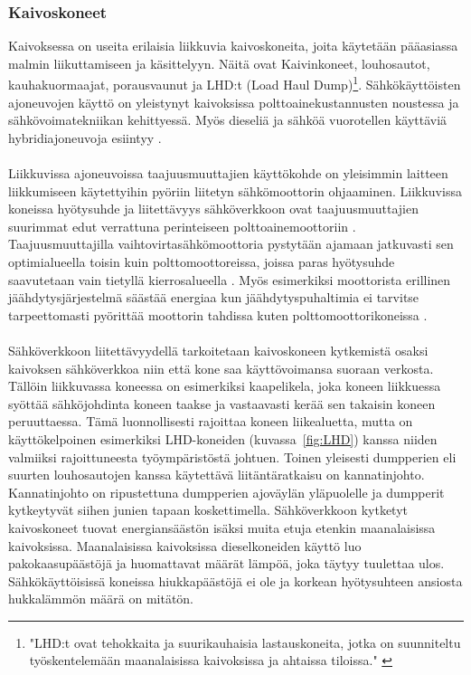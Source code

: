\documentclass[finnish,12pt,a4paper,pdftex,elec,utf8]{aaltothesis}
\begin{document}
\subsubsection{Kaivoskoneet}
Kaivoksessa on useita erilaisia liikkuvia kaivoskoneita, joita käytetään pääasiassa malmin liikuttamiseen ja käsittelyyn. Näitä ovat Kaivinkoneet, louhosautot, kauhakuormaajat, porausvaunut ja LHD:t (Load Haul Dump)\footnote{"LHD:t ovat tehokkaita ja suurikauhaisia lastauskoneita, jotka on suunniteltu työskentelemään maanalaisissa kaivoksissa ja ahtaissa tiloissa." \cite[s. 192]{Hakapää}}. Sähkökäyttöisten ajoneuvojen käyttö on yleistynyt kaivoksissa polttoainekustannusten noustessa ja sähkövoimatekniikan kehittyessä. Myös dieseliä ja sähköä vuorotellen käyttäviä hybridiajoneuvoja esiintyy \cite{Brown}.
\\\\
Liikkuvissa ajoneuvoissa taajuusmuuttajien käyttökohde on yleisimmin laitteen liikkumiseen käytettyihin pyöriin liitetyn sähkömoottorin ohjaaminen. Liikkuvissa koneissa hyötysuhde ja liitettävyys sähköverkkoon ovat taajuusmuuttajien suurimmat edut verrattuna perinteiseen polttoainemoottoriin \cite{Brown}. Taajuusmuuttajilla vaihtovirtasähkömoottoria pystytään ajamaan jatkuvasti sen optimialueella toisin kuin polttomoottoreissa, joissa paras hyötysuhde saavutetaan vain tietyllä kierrosalueella \cite{Brown}. Myös esimerkiksi moottorista erillinen jäähdytysjärjestelmä säästää energiaa kun jäähdytyspuhaltimia ei tarvitse tarpeettomasti pyörittää moottorin tahdissa kuten polttomoottorikoneissa \cite{Brown}. 
\\\\
Sähköverkkoon liitettävyydellä tarkoitetaan kaivoskoneen kytkemistä osaksi kaivoksen sähköverkkoa niin että kone saa käyttövoimansa suoraan verkosta. Tällöin liikkuvassa koneessa on  esimerkiksi kaapelikela, joka koneen liikkuessa syöttää sähköjohdinta koneen taakse ja vastaavasti kerää sen takaisin koneen peruuttaessa. Tämä luonnollisesti rajoittaa koneen liikealuetta, mutta on käyttökelpoinen esimerkiksi LHD-koneiden (kuvassa~\ref{fig:LHD}) kanssa niiden valmiiksi rajoittuneesta työympäristöstä johtuen. Toinen yleisesti dumpperien eli suurten louhosautojen kanssa käytettävä liitäntäratkaisu on kannatinjohto. Kannatinjohto on ripustettuna dumpperien ajoväylän yläpuolelle ja dumpperit kytkeytyvät siihen junien tapaan koskettimella. Sähköverkkoon kytketyt kaivoskoneet tuovat energiansäästön isäksi muita etuja etenkin maanalaisissa kaivoksissa. Maanalaisissa kaivoksissa dieselkoneiden käyttö luo pakokaasupäästöjä ja huomattavat määrät lämpöä, joka täytyy tuulettaa ulos. Sähkökäyttöisissä koneissa hiukkapäästöjä ei ole ja korkean hyötysuhteen ansiosta hukkalämmön määrä on mitätön.
\end{document}

